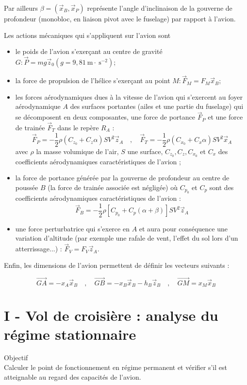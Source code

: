 \documentclass[10pt]{article}
\begin{document}
Par ailleurs $\beta=\left(\vec{x}_{B}, \vec{x}_{P}\right)$ représente l'angle d'inclinaison de la gouverne de profondeur (monobloc, en liaison pivot avec le fuselage) par rapport à l'avion.

Les actions mécaniques qui s'appliquent sur l'avion sont

\begin{itemize}
  \item[-] le poids de l'avion s'exerçant au centre de gravité $G: \vec{P}=m g \vec{z}_{0}\left(g=9,81 \mathrm{~m} \cdot \mathrm{~s}^{-2}\right)$;
  \item[-] la force de propulsion de l'hélice s'exerçant au point $M: \vec{F}_{M}=F_{M} \vec{x}_{B}$;
  \item[-] les forces aérodynamiques dues à la vitesse de l'avion qui s'exercent au foyer aérodynamique $A$ des surfaces portantes (ailes et une partie du fuselage) qui se décomposent en deux composantes, une force de portance $\vec{F}_{P}$ et une force de trainée $\vec{F}_{T}$ dans le repère $R_{A}$ :
$$
\vec{F}_{P}=-\frac{1}{2} \rho\left(C_{z_{0}}+C_{z} \alpha\right) S V^{2} \vec{z}_{A} \quad, \quad \vec{F}_{T}=-\frac{1}{2} \rho\left(C_{x_{0}}+C_{x} \alpha\right) S V^{2} \vec{x}_{A}
$$
avec $\rho$ la masse volumique de l'air, $S$ une surface, $C_{z_{0}}, C_{z}, C_{x_{0}}$ et $C_{x}$ des coefficients aérodynamiques caractéristiques de l'avion ;
  \item[-] la force de portance générée par la gouverne de profondeur au centre de poussée $B$ (la force de trainée associée est négligée) où $C_{p_{0}}$ et $C_{p}$ sont des coefficients aérodynamiques caractéristiques de l'avion :
$$
\vec{F}_{B}=-\frac{1}{2} \rho\left[C_{p_{0}}+C_{p}(\alpha+\beta)\right] S V^{2} \vec{z}_{A}
$$
  \item[-] une force perturbatrice qui s'exerce en $A$ et aura pour conséquence une variation d'altitude (par exemple une rafale de vent, l'effet du sol lors d'un atterrissage...) : $\vec{F}_{V}=F_{V} \vec{z}_{A}$.
\end{itemize}

Enfin, les dimensions de l'avion permettent de définir les vecteurs suivants :

$$
\overrightarrow{G A}=-x_{A} \vec{x}_{B} \quad, \quad \overrightarrow{G B}=-x_{B} \vec{x}_{B}-h_{B} \vec{z}_{B} \quad, \quad \overrightarrow{G M}=x_{M} \vec{x}_{B}
$$

\section*{I - Vol de croisière : analyse du régime stationnaire}
Objectif\\
Calculer le point de fonctionnement en régime permanent et vérifier s'il est atteignable au regard des capacités de l'avion.
\end{document}
